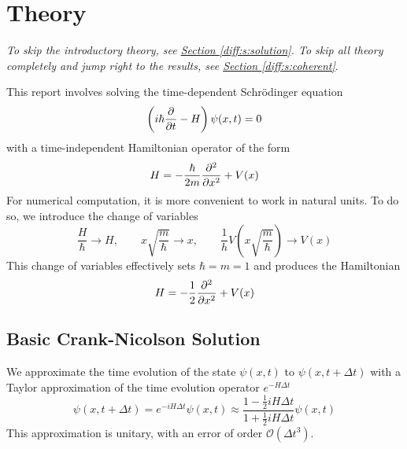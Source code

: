 \documentclass[11pt, a4paper]{article}
\newcommand{\schro}{Schr\"{o}dinger\xspace}
\begin{document}
\newpage


\section{Theory} \label{diff:s:theory}
\vspace{-2mm}
\textit{To skip the introductory theory, see \hyperref[diff:s:solution]{Section \ref{diff:s:solution}}. To skip all theory completely and jump right to the results, see \hyperref[diff:s:coherent]{Section \ref{diff:s:coherent}}}.

\vspace{2mm}

This report involves solving the time-dependent \schro equation
\begin{equation*}
	\left(i \hbar \pdv{t} - H\right) \psi(x, t) = 0
\end{equation*}
with a time-independent Hamiltonian operator of the form
\begin{equation*}
	H = - \frac{\hbar}{2m}\pdv[2]{}{x} + V(x)
\end{equation*}
For numerical computation, it is more convenient to work in natural units. To do so, we introduce the change of variables
\begin{equation*}
	\frac{H}{\hbar} \to H, \qquad x \sqrt{\frac{m}{\hbar}} \to x, \qquad \frac{1}{h}V\left(x\sqrt{\frac{m}{\hbar}}\right) \to V(x)
\end{equation*}
This change of variables effectively sets $ \hbar = m = 1 $ and produces the Hamiltonian
\begin{equation}
	H = - \frac{1}{2}\pdv[2]{}{x} + V(x) \label{diff:eqn:H-dimensionless}
\end{equation}

\subsection{Basic Crank-Nicolson Solution}  \label{diff:ss:CN-basic}
We approximate the time evolution of the state $ \psi(x, t) $ to $ \psi(x, t + \Delta t) $ with a Taylor approximation of the time evolution operator $ e^{-H \Delta t} $
\begin{equation}
	\psi(x, t + \Delta t) = e^{-iH\Delta t}\psi(x, t) \approx \frac{1 - \tfrac{1}{2}iH\Delta t}{1 + \tfrac{1}{2}iH\Delta t}\psi(x, t) \label{diff:eq:schro-approx}
\end{equation}
This approximation is unitary, with an error of order $ \mathcal{O}(\Delta t^{3}) $. 
\end{document}
